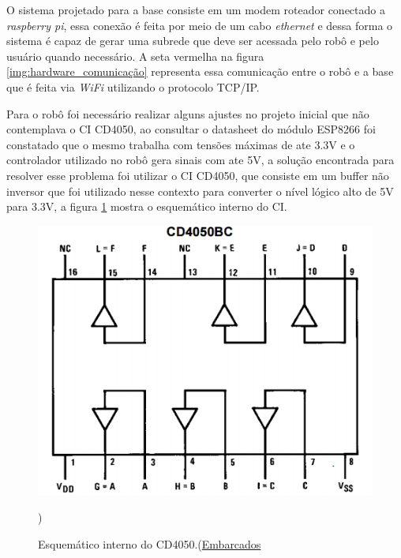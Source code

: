     	O sistema projetado para a base consiste em um modem roteador conectado a \textit{raspberry pi}, essa conexão é feita por meio de um cabo \textit{ethernet} e dessa forma o sistema é capaz de gerar uma subrede que deve ser acessada pelo robô e pelo usuário quando necessário. A seta vermelha na figura \ref{img:hardware_comunicação} representa essa comunicação entre o robô e a base que é feita via \textit{WiFi} utilizando o protocolo TCP/IP.

    	Para o robô foi necessário realizar alguns ajustes no projeto inicial que não contemplava o CI CD4050, ao consultar o datasheet do módulo ESP8266 foi constatado que o mesmo trabalha com tensões máximas de ate 3.3V e o controlador utilizado no robô gera sinais com ate 5V, a solução encontrada para resolver esse problema foi utilizar o CI CD4050, que consiste em um buffer não inversor que foi utilizado nesse contexto para converter o nível lógico alto de 5V para 3.3V, a figura \ref{img:datasheet_cd4050} mostra o esquemático interno do CI.

    	\begin{figure}[H]                                                           
      		\centering                    
      		\includegraphics[scale=0.4]{figuras/cd4050.png}               
      		\caption{Esquemático interno do CD4050.(\href{http://www.embarcados.com.br/esp8266-com-arduino/}{Embarcados}})    
      		\label{img:datasheet_cd4050}                                            
    	\end{figure}

